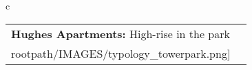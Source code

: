 \begin{table}[H]
        \begin{tabular}{c}
        \begin{tabular}{m{1.5in} m{2in}}
\textbf{Hughes Apartments:} {High-rise in the park} & \texttt{[image: \\rootpath/IMAGES/typology\_towerpark.png]}
\end{tabular}\end{tabular}
        \end{table}